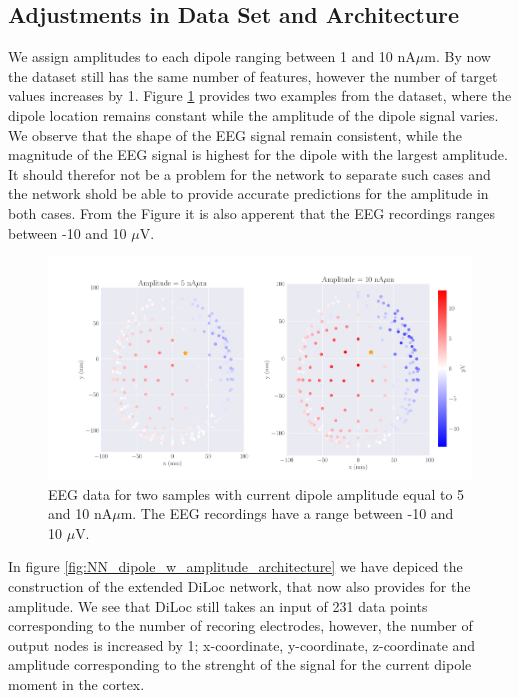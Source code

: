 \documentclass[a4paper, UKenglish, 11pt]{uiomaster}
\begin{document}
\subsection{Adjustments in Data Set and Architecture}

We assign amplitudes to each dipole ranging between 1 and 10 nA$\mu$m. By now the dataset still has the same number of features, however the number of target values increases by 1. Figure \ref{fig:dipole_w_amplitude_example} provides two examples from the dataset, where the dipole location remains constant while the amplitude of the dipole signal varies. We observe that the shape of the EEG signal remain consistent, while the magnitude of the EEG signal is highest for the dipole with the largest amplitude. It should therefor not be a problem for the network to separate such cases and the network shold be able to provide accurate predictions for the amplitude in both cases. From the Figure it is also apperent that the EEG recordings ranges between -10 and 10 $\mu$V. 

\begin{figure}[!htb]
    \centering
    \includegraphics[width=\linewidth]{figures/dipole_w_amplitude_example.pdf}
    \caption{EEG data for two samples with current dipole amplitude equal to 5 and 10 nA$\mu$m. The EEG recordings have a range between -10 and 10 $\mu$V.}
    \label{fig:dipole_w_amplitude_example}
\end{figure}

In figure \ref{fig:NN_dipole_w_amplitude_architecture} we have depiced the construction of the extended DiLoc network, that now also provides for the amplitude. We see that DiLoc still takes an input of 231 data points corresponding to the number of recoring electrodes, however, the number of output nodes is increased by 1; x-coordinate, y-coordinate, z-coordinate and amplitude corresponding to the strenght of the signal for the current dipole moment in the cortex.
\end{document}
